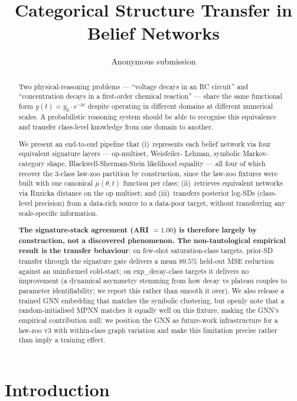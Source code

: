 \documentclass{article}
\title{\textbf{Categorical Structure Transfer in Belief Networks}}
\author{%
  Anonymous submission\\
}
\date{}
\begin{document}
\maketitle

\begin{abstract}
\noindent
Two physical-reasoning problems --- ``voltage decays in an RC circuit''
and ``concentration decays in a first-order chemical reaction'' --- share
the same functional form $y(t) = y_{0} \cdot e^{-k t}$ despite operating
in different domains at different numerical scales. A probabilistic
reasoning system should be able to recognise this equivalence and
transfer class-level knowledge from one domain to another.

We present an end-to-end pipeline that (i)~represents each belief
network via four equivalent signature layers — op-multiset, Weisfeiler-
Lehman, symbolic Markov-category shape, Blackwell-Sherman-Stein
likelihood equality — all four of which recover the
$3$-class law-zoo partition by construction, since the law-zoo
fixtures were built with one canonical $\mu(\theta, t)$ function per
class; (ii)~retrieves equivalent networks via Ruzicka distance on the
op multiset; and (iii)~transfers posterior log-SDs (class-level
precision) from a data-rich source to a data-poor target, without
transferring any scale-specific information.

\textbf{The signature-stack agreement (ARI $= 1.00$) is therefore
largely by construction, not a discovered phenomenon. The
non-tautological empirical result is the transfer behaviour}: on
few-shot saturation-class targets, prior-SD transfer through the
signature gate delivers a mean $89.5\%$ held-out MSE reduction
against an uninformed cold-start; on exp\_decay-class targets it
delivers no improvement (a dynamical asymmetry stemming from how
decay vs plateau couples to parameter identifiability; we report
this rather than smooth it over). We also release a trained GNN
embedding that matches the symbolic clustering, but openly note that
a random-initialised MPNN matches it equally well on this fixture,
making the GNN's empirical contribution null; we position the GNN
as future-work infrastructure for a law-zoo v3 with within-class
graph variation and make this limitation precise rather than imply
a training effect.
\end{abstract}

\section{Introduction}
\label{sec:intro}
\end{document}
